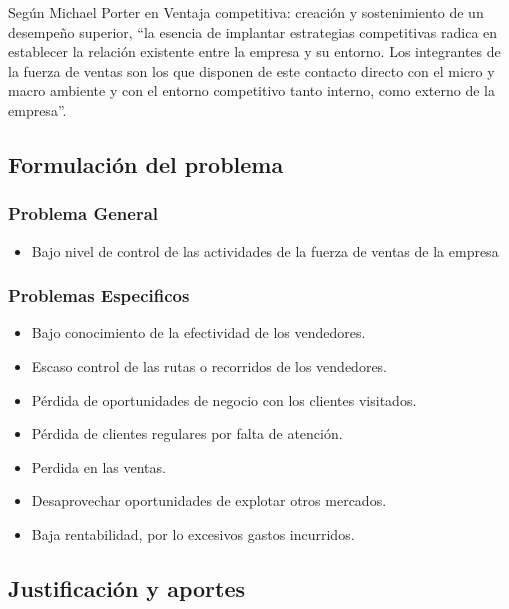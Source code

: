 Según Michael Porter en Ventaja competitiva: creación y sostenimiento de un desempeño superior, “la esencia de implantar estrategias competitivas radica en establecer la relación existente entre la empresa y su entorno. Los integrantes de la fuerza de ventas son los que disponen de este contacto directo con el micro y macro ambiente y con el entorno competitivo tanto interno, como externo de la empresa”.

\singlespacing

\newpage

\subsection{Formulación del problema}
\subsubsection{Problema General}

\begin{itemize}[leftmargin=1cm]
\item Bajo nivel de control de las actividades de la fuerza de ventas de la empresa
\end{itemize}

\subsubsection{Problemas Especificos}


\begin{itemize}[leftmargin=1cm]
\item Bajo conocimiento de la efectividad de los vendedores.
\item Escaso control de las rutas o recorridos de los vendedores.
\item Pérdida de oportunidades de negocio con los clientes visitados.
\item Pérdida de clientes regulares por falta de atención.
\item Perdida en las ventas.
\item Desaprovechar oportunidades de explotar otros mercados.
\item Baja rentabilidad, por lo excesivos gastos incurridos.
\end{itemize} 




\subsection{Justificación y aportes}

